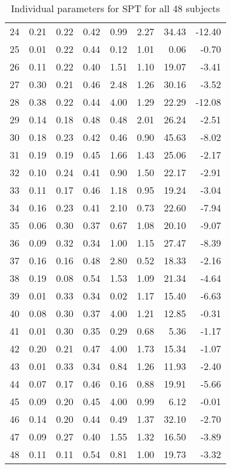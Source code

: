 \begin{table}[!htb]
\begin{tabular}{rrrrrrrr}
  24 & 0.21 & 0.22 & 0.42 & 0.99 & 2.27 & 34.43 & -12.40 \\ 
  25 & 0.01 & 0.22 & 0.44 & 0.12 & 1.01 & 0.06 & -0.70 \\ 
  26 & 0.11 & 0.22 & 0.40 & 1.51 & 1.10 & 19.07 & -3.41 \\ 
  27 & 0.30 & 0.21 & 0.46 & 2.48 & 1.26 & 30.16 & -3.52 \\ 
  28 & 0.38 & 0.22 & 0.44 & 4.00 & 1.29 & 22.29 & -12.08 \\ 
  29 & 0.14 & 0.18 & 0.48 & 0.48 & 2.01 & 26.24 & -2.51 \\ 
  30 & 0.18 & 0.23 & 0.42 & 0.46 & 0.90 & 45.63 & -8.02 \\ 
  31 & 0.19 & 0.19 & 0.45 & 1.66 & 1.43 & 25.06 & -2.17 \\ 
  32 & 0.10 & 0.24 & 0.41 & 0.90 & 1.50 & 22.17 & -2.91 \\ 
  33 & 0.11 & 0.17 & 0.46 & 1.18 & 0.95 & 19.24 & -3.04 \\ 
  34 & 0.16 & 0.23 & 0.41 & 2.10 & 0.73 & 22.60 & -7.94 \\ 
  35 & 0.06 & 0.30 & 0.37 & 0.67 & 1.08 & 20.10 & -9.07 \\ 
  36 & 0.09 & 0.32 & 0.34 & 1.00 & 1.15 & 27.47 & -8.39 \\ 
  37 & 0.16 & 0.16 & 0.48 & 2.80 & 0.52 & 18.33 & -2.16 \\ 
  38 & 0.19 & 0.08 & 0.54 & 1.53 & 1.09 & 21.34 & -4.64 \\ 
  39 & 0.01 & 0.33 & 0.34 & 0.02 & 1.17 & 15.40 & -6.63 \\ 
  40 & 0.08 & 0.30 & 0.37 & 4.00 & 1.21 & 12.85 & -0.31 \\ 
  41 & 0.01 & 0.30 & 0.35 & 0.29 & 0.68 & 5.36 & -1.17 \\ 
  42 & 0.20 & 0.21 & 0.47 & 4.00 & 1.73 & 15.34 & -1.07 \\ 
  43 & 0.01 & 0.33 & 0.34 & 0.84 & 1.26 & 11.93 & -2.40 \\ 
  44 & 0.07 & 0.17 & 0.46 & 0.16 & 0.88 & 19.91 & -5.66 \\ 
  45 & 0.09 & 0.20 & 0.45 & 4.00 & 0.99 & 6.12 & -0.01 \\ 
  46 & 0.14 & 0.20 & 0.44 & 0.49 & 1.37 & 32.10 & -2.70 \\ 
  47 & 0.09 & 0.27 & 0.40 & 1.55 & 1.32 & 16.50 & -3.89 \\ 
  48 & 0.11 & 0.11 & 0.54 & 0.81 & 1.00 & 19.73 & -3.32 \\ 
   \hline
\end{tabular}
\caption{Individual parameters for SPT for all 48 subjects} 
\label{table_A2_median_pars}
\end{table}
